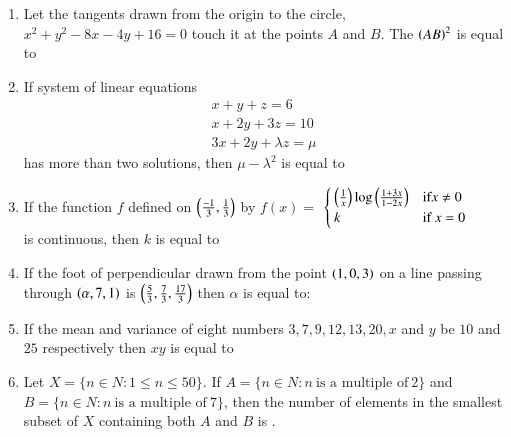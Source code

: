 \documentclass[journal]{IEEEtran}
\begin{document}
\begin{enumerate}
\item Let the tangents drawn from the origin to the circle, $x^2 + y^2 - 8x - 4y + 16 = 0$ touch it at the points $A$ and $B$. The $\left(AB\right)^2$ is equal to
\begin{enumerate}
\end{enumerate}

\item If system of linear equations \\
\begin{align}
   x+y+z=6  \\
   x + 2y + 3z = 10 \\
   3x + 2y + \lambda z = \mu
\end{align}
has more than two solutions, then $\mu - \lambda^2$ is equal to


\item If the function $f$ defined on $\left(\frac{-1}{3},\frac{1}{3}\right)$ by
    $f(x) = $
$\begin{cases}
   \left(\frac{1}{x}\right)\log\left(\frac{1+3x}{1-2x}\right)  & \text{if} x \neq 0\\
    k & \text{if} \  x=0
\end{cases}$\\ 
is continuous, then $k$ is equal to

\item If the foot of perpendicular drawn from the point $\left(1,0,3\right)$ on a line passing through $\left(\alpha,7,1\right)$ is $\left(\frac{5}{3},\frac{7}{3},\frac{17}{3}\right)$ then $\alpha$ is equal to:

\item  If the mean and variance of eight numbers $3, 7, 9, 12, 13, 20, x$ and $y$ be $10$ and $25$ respectively then $xy$ is equal to

\item Let $X = \{n \in N: 1 \leq n \leq 50\}$. If $A= \{n \in N: n \ \text{is a multiple of} \ 2\}$ and $B = \{n \in N: n \ \text{is a multiple of} \ 7\}$, then the number of elements in the smallest subset of $X$ containing both $A$ and $B$ is .









\end{enumerate}
\end{document}
